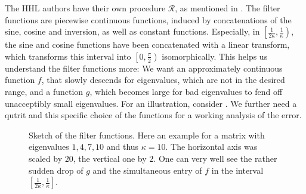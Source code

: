 The HHL authors have their own procedure \(\mathcal{R}\), as mentioned in . The filter functions are piecewise continuous functions, induced by concatenations of the sine, cosine and inversion, as well as constant functions. Especially, in \(\left[\frac{1}{2\kappa}, \frac{1}{\kappa}\right)\), the sine and cosine functions have been concatenated with a linear transform, which transforms this interval into \(\left[0, \frac{\pi}{2}\right)\) isomorphically. This helps us understand the filter functions more: We want an approximately continuous function \(f\), that slowly descends for eigenvalues, which are not in the desired range, and a function \(g\), which becomes large for bad eigenvalues to fend off unacceptibly small eigenvalues. For an illustration, consider . We further need a qutrit and this specific choice of the functions for a working analysis of the error.

\begin{figure}[!hbtp]
    \centering
    \caption{Sketch of the filter functions. Here an example for a matrix with eigenvalues \(1, 4, 7, 10\) and thus \(\kappa = 10\). The horizontal axis was scaled by \(20\), the vertical one by \(2\). One can very well see the rather sudden drop of \(g\) and the simultaneous entry of \(f\) in the interval \(\left[\frac{1}{2\kappa}, \frac{1}{\kappa}\right]\).}
    \label{filter_functions_visualization}
\end{figure}

